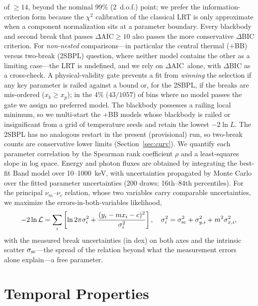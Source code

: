 \documentclass[twocolumn]{aastex631}
\newcommand{\nuc}{\ensuremath{\nu_c}}
\newcommand{\num}{\ensuremath{\nu_m}}
\newcommand{\daic}{\ensuremath{\Delta\mathrm{AIC}}}
\newcommand{\ssc}{\ensuremath{\sigma_{\rm sc}}}
\begin{document}
\citep{Wilks1938} of $\ge$$14$, beyond the nominal 99\% (2~d.o.f.) point; we
prefer the information-criterion form because the $\chi^2$ calibration of the
classical LRT is only approximate when a component normalization sits at a
parameter boundary. Every blackbody and second break that passes $\daic\ge10$
also passes the more conservative $\Delta\mathrm{BIC}$ criterion. For
\emph{non-nested} comparisons---in particular the central thermal
($+$BB) versus two-break (2SBPL) question, where neither model contains the
other as a limiting case---the LRT is undefined, and we rely
on \daic\ alone, with $\Delta\mathrm{BIC}$ as a cross-check. A physical-validity
gate prevents a fit from \emph{winning} the selection if any key parameter is
railed against a bound or, for the 2SBPL, if the breaks are mis-ordered
($x_b\ge x_p$); in the $4\%$ ($43/1057$) of bins where no model passes the gate
we assign no preferred model. The blackbody possesses a railing local minimum,
so we multi-start the $+$BB models whose blackbody is railed or insignificant
from a grid of temperature seeds and retain the lowest $-2\ln L$. The 2SBPL has
no analogous restart in the present (provisional) run, so two-break counts are
conservative lower limits (Section~\ref{sec:curv}). We quantify each parameter
correlation by the Spearman rank coefficient $\rho$ and a least-squares slope in
log space. Energy and photon fluxes are obtained by integrating the best-fit
Band model over 10--1000~keV, with uncertainties propagated by Monte Carlo over
the fitted parameter uncertainties (200 draws; 16th--84th percentiles). For the
principal $\num$--$\nuc$ relation, whose two variables carry comparable
uncertainties, we maximize the \citet{DAgostini2005} errors-in-both-variables
likelihood,
\begin{equation}
-2\ln\mathcal{L}=\sum_i\left[\ln 2\pi\sigma_i^2
+\frac{(y_i-m x_i-c)^2}{\sigma_i^2}\right],\quad
\sigma_i^2=\ssc^2+\sigma_{y,i}^2+m^2\sigma_{x,i}^2,
\label{eq:dagostini}
\end{equation}
with the measured break uncertainties (in dex) on both axes and the intrinsic
scatter \ssc---the spread of the relation beyond what the measurement errors
alone explain---a free parameter.


\section{Temporal Properties} \label{sec:temporal}
\end{document}

